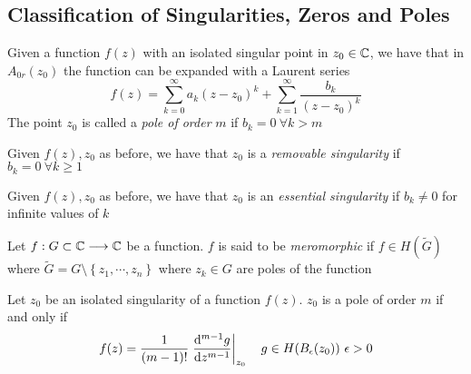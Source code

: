 \documentclass[../complete.tex]{subfiles}
\begin{document}
\subsection{Classification of Singularities, Zeros and Poles}
\begin{dfn}[Pole]
	Given a function $f(z)$ with an isolated singular point in $z_0\in\mathbb{C}$, we have that in $A_{0r}(z_0)$ the function can be expanded with a Laurent series
	\begin{equation*}
		f(z)=\sum_{k=0}^{\infty}a_k(z-z_0)^k+\sum_{k=1}^{\infty}\frac{b_k}{(z-z_0)^k}
	\end{equation*}
	The point $z_0$ is called a \textit{pole of order} $m$ if $b_k=0\ \forall k>m$
\end{dfn}
\begin{dfn}
	Given $f(z),z_0$ as before, we have that $z_0$ is a \textit{removable singularity} if $b_k=0\ \forall k\ge1$
\end{dfn}
\begin{dfn}
	Given $f(z),z_0$ as before, we have that $z_0$ is an \textit{essential singularity} if $b_k\ne0$ for infinite values of $k$
\end{dfn}
\begin{dfn}
	Let $f:G\subset\mathbb{C}\overset{}{\longrightarrow}\mathbb{C}$ be a function. $f$ is said to be \textit{meromorphic} if $f\in H(\tilde{G})$ where $\tilde{G}=G\setminus\left\{ z_1,\cdots,z_n \right\}$ where $z_k\in G$ are poles of the function
\end{dfn}
\begin{thm}
	Let $z_0$ be an isolated singularity of a function $f(z)$. $z_0$ is a pole of order $m$ if and only if
	\begin{equation}
		f(z)=\frac{1}{(m-1)!}\left.\derivative[m-1]{g}{z}\right|_{z_0}\quad g\in H(B_\epsilon(z_0))\ \epsilon>0
		\label{eq:pole m}
	\end{equation}
\end{thm}
\end{document}
